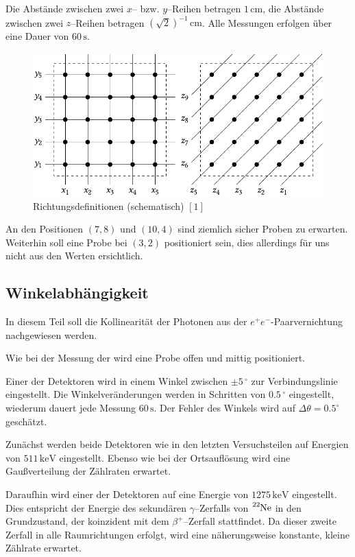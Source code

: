 \documentclass[12pt,a4paper]{scrartcl}
\numberwithin{equation}{section} %
\newcommand{\pu}[1]{\ensuremath{\mathrm{#1}}}
\begin{document}
Die Abstände zwischen zwei $x$-- bzw. $y$--Reihen betragen $\pu{1\,cm}$, die Abstände zwischen zwei $z$--Reihen betragen $(\sqrt{2})^{-1}\,\mathrm{cm}$. Alle Messungen erfolgen über eine Dauer von $60\,\mathrm{s}$.

\begin{figure}[h]
	\centering
	\includegraphics{../media/B3.4/Box_Axis.pdf}
	\caption{Richtungsdefinitionen (schematisch) $[1]$}
	\label{abb:TruheRichtungen}
\end{figure}

An den Positionen $(7,8)$ und $(10,4)$ sind ziemlich sicher Proben zu erwarten. Weiterhin soll eine Probe bei $(3, 2)$ positioniert sein, dies allerdings für uns nicht aus den Werten ersichtlich.

\subsection{Winkelabhängigkeit}
In diesem Teil soll die Kollinearität der Photonen aus der $e^+e^-$-Paarvernichtung nachgewiesen werden.

Wie bei der Messung der  wird eine Probe offen und mittig positioniert.

Einer der Detektoren wird in einem Winkel zwischen $\pm 5\,^\circ$ zur Verbindungslinie eingestellt. Die Winkelveränderungen werden in Schritten von $0.5\,^\circ$ eingestellt, wiederum dauert jede Messung $60\,\mathrm{s}$. Der Fehler des Winkels wird auf $\Delta \theta = \pu{0.5^\circ}$ geschätzt.

Zunächst werden beide Detektoren wie in den letzten Versuchsteilen auf Energien von $\pu{511\,keV}$ eingestellt. Ebenso wie bei der Ortsauflösung wird eine Gaußverteilung der Zählraten erwartet.

Daraufhin wird einer der Detektoren auf eine Energie von $\pu{1275\,keV}$ eingestellt. Dies entspricht der Energie des sekundären $\gamma$--Zerfalls von $\ce{^{22}Ne}$ in den Grundzustand, der koinzident mit dem $\beta^+$--Zerfall stattfindet. Da dieser zweite Zerfall in alle Raumrichtungen erfolgt, wird eine näherungsweise konstante, kleine Zählrate erwartet.
\end{document}
